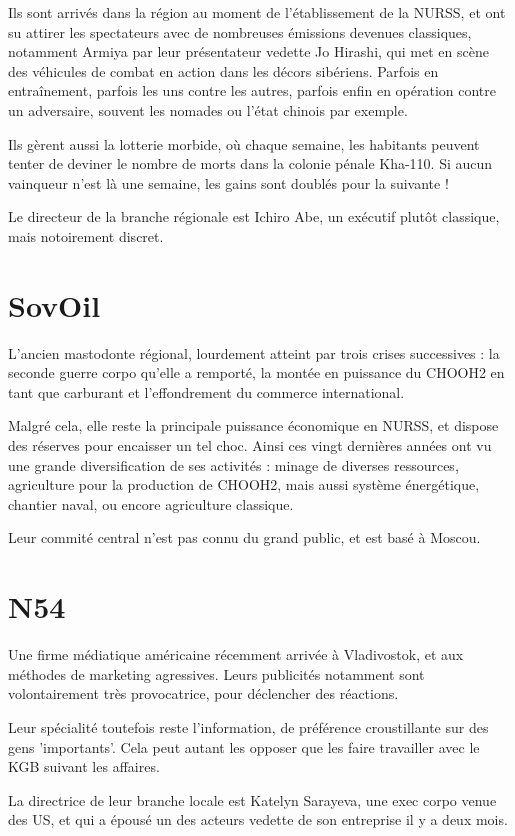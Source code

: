 \documentclass[10pt,a4paper]{book}
\begin{document}
Ils sont arrivés dans la région au moment de l'établissement de la NURSS, et ont su attirer les spectateurs avec de nombreuses émissions devenues classiques, notamment Armiya par leur présentateur vedette Jo Hirashi, qui met en scène des véhicules de combat en action dans les décors sibériens. Parfois en entraînement, parfois les uns contre les autres, parfois enfin en opération contre un adversaire, souvent les nomades ou l'état chinois par exemple.

Ils gèrent aussi la lotterie morbide, où chaque semaine, les habitants peuvent tenter de deviner le nombre de morts dans la colonie pénale Kha-110. Si aucun vainqueur n'est là une semaine, les gains sont doublés pour la suivante !

Le directeur de la branche régionale est Ichiro Abe, un exécutif plutôt classique, mais notoirement discret.
\section{SovOil}
L'ancien mastodonte régional, lourdement atteint par trois crises successives : la seconde guerre corpo qu'elle a remporté, la montée en puissance du CHOOH2 en tant que carburant et l'effondrement du commerce international.

Malgré cela, elle reste la principale puissance économique en NURSS, et dispose des réserves pour encaisser un tel choc. Ainsi ces vingt dernières années ont vu une grande diversification de ses activités : minage de diverses ressources, agriculture pour la production de CHOOH2, mais aussi système énergétique, chantier naval, ou encore agriculture classique.

Leur commité central n'est pas connu du grand public, et est basé à Moscou.
\section{N54}
Une firme médiatique américaine récemment arrivée à Vladivostok, et aux méthodes de marketing agressives. Leurs publicités notamment sont volontairement très provocatrice, pour déclencher des réactions.

Leur spécialité toutefois reste l'information, de préférence croustillante sur des gens 'importants'. Cela peut autant les opposer que les faire travailler avec le KGB suivant les affaires.

La directrice de leur branche locale est Katelyn Sarayeva, une exec corpo venue des US, et qui a épousé un des acteurs vedette de son entreprise il y a deux mois.
\end{document}
